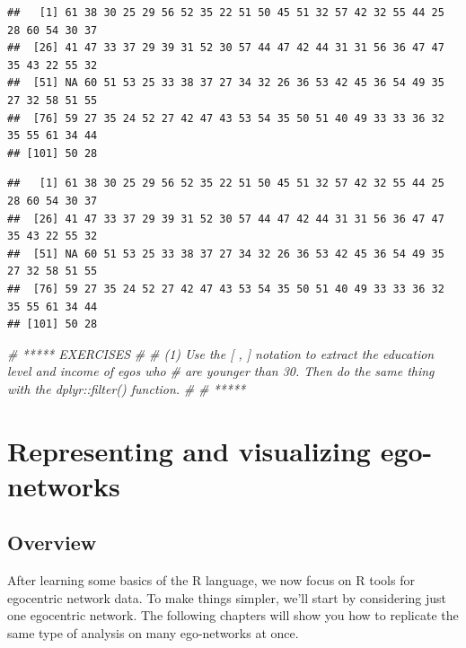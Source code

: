 \documentclass[
]{book}
\newenvironment{Shaded}{\begin{snugshade}}{\end{snugshade}}
\newcommand{\CommentTok}[1]{\textcolor[rgb]{0.56,0.35,0.01}{\textit{#1}}}
\newcommand{\NormalTok}[1]{#1}
\newcommand{\SpecialCharTok}[1]{\textcolor[rgb]{0.00,0.00,0.00}{#1}}
\begin{document}
\begin{verbatim}
##   [1] 61 38 30 25 29 56 52 35 22 51 50 45 51 32 57 42 32 55 44 25 28 60 54 30 37
##  [26] 41 47 33 37 29 39 31 52 30 57 44 47 42 44 31 31 56 36 47 47 35 43 22 55 32
##  [51] NA 60 51 53 25 33 38 37 27 34 32 26 36 53 42 45 36 54 49 35 27 32 58 51 55
##  [76] 59 27 35 24 52 27 42 47 43 53 54 35 50 51 40 49 33 33 36 32 35 55 61 34 44
## [101] 50 28
\end{verbatim}

\begin{Shaded}
\end{Shaded}

\begin{verbatim}
##   [1] 61 38 30 25 29 56 52 35 22 51 50 45 51 32 57 42 32 55 44 25 28 60 54 30 37
##  [26] 41 47 33 37 29 39 31 52 30 57 44 47 42 44 31 31 56 36 47 47 35 43 22 55 32
##  [51] NA 60 51 53 25 33 38 37 27 34 32 26 36 53 42 45 36 54 49 35 27 32 58 51 55
##  [76] 59 27 35 24 52 27 42 47 43 53 54 35 50 51 40 49 33 33 36 32 35 55 61 34 44
## [101] 50 28
\end{verbatim}

\begin{Shaded}
\begin{Highlighting}[]
\CommentTok{\# ***** EXERCISES }
\CommentTok{\#}
\CommentTok{\# (1) Use the [ , ] notation to extract the education level and income of egos who}
\CommentTok{\# are younger than 30. Then do the same thing with the dplyr::filter() function.}
\CommentTok{\# }
\CommentTok{\# *****}
\end{Highlighting}
\end{Shaded}

\hypertarget{represent}{%
\chapter{Representing and visualizing ego-networks}\label{represent}}

\hypertarget{overview-1}{%
\section{Overview}\label{overview-1}}

After learning some basics of the R language, we now focus on R tools for egocentric network data. To make things simpler, we'll start by considering just one egocentric network. The following chapters will show you how to replicate the same type of analysis on many ego-networks at once.
\end{document}
